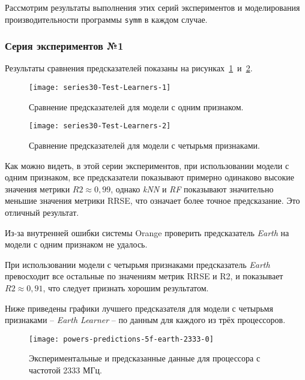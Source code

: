 Рассмотрим результаты выполнения этих серий экспериментов и моделирования производительности программы \texttt{symm} в каждом случае.

\subsubsection{Серия экспериментов №1}

Результаты сравнения предсказателей показаны на рисунках~\ref{img:series30-Test-Learners-1}~и~\ref{img:series30-Test-Learners-2}.

\begin{figure}[H]
    \begin{center}
            \texttt{[image: series30-Test-Learners-1]}
            \caption{Сравнение предсказателей для модели с одним признаком.} %
            \label{img:series30-Test-Learners-1} %
    \end{center}
\end{figure}

\begin{figure}[H]
    \begin{center}
            \texttt{[image: series30-Test-Learners-2]}
            \caption{Сравнение предсказателей для модели с четырьмя признаками.}
            \label{img:series30-Test-Learners-2}
    \end{center}
\end{figure}

Как можно видеть, в этой серии экспериментов, при использовании модели с одним признаком, все предсказатели показывают примерно одинаково высокие значения метрики $R2 \approx 0,99$, однако \textit{kNN} и \textit{RF} показывают значительно меньшие значения метрики RRSE, что означает более точное предсказание. Это отличный результат.

Из-за внутренней ошибки системы Orange проверить предсказатель \textit{Earth} на модели с одним признаком не удалось.

При использовании модели с четырьмя признаками предсказатель \textit{Earth} превосходит все остальные по значениям метрик RRSE и R2, и показывает $R2 \approx 0,91$, что следует признать хорошим результатом.

Ниже приведены графики лучшего предсказателя для модели с четырьмя признаками -- \textit{Earth Learner} -- по данным для каждого из трёх процессоров.

\begin{figure}[H]
    \begin{center}
        \texttt{[image: powers-predictions-5f-earth-2333-0]}
        \caption{Экспериментальные и предсказанные данные для процессора с частотой 2333 МГц.}
        \label{img:powers-predictions-5f-earth-2333-0}
    \end{center}
\end{figure}

